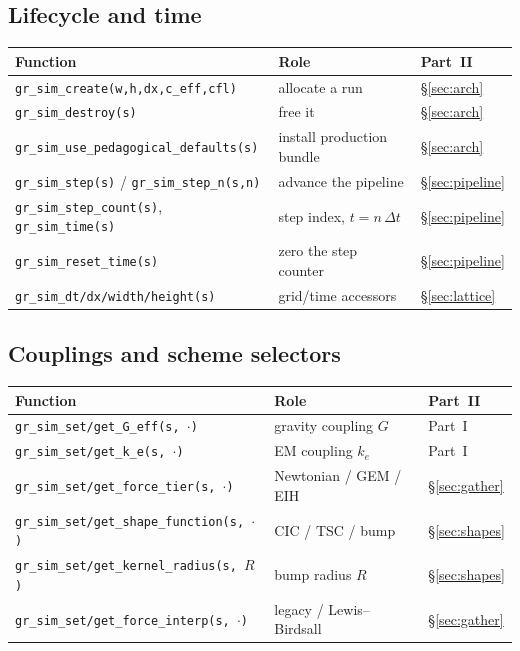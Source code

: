 \documentclass[11pt]{article}
\newcommand{\dt}{\Delta t}                 %
\newcommand{\keff}{k_e}
\begin{document}
\subsection{Lifecycle and time}
\nopagebreak
{\footnotesize
\begin{tabular}{@{}F{8.2cm}L{4.9cm}L{1.4cm}@{}}
\toprule
\textbf{Function} & \textbf{Role} & \textbf{Part~II} \\
\midrule
\texttt{gr\_sim\_create(w,h,dx,c\_eff,cfl)} & allocate a run & \S\ref{sec:arch} \\
\texttt{gr\_sim\_destroy(s)} & free it & \S\ref{sec:arch} \\
\texttt{gr\_sim\_use\_pedagogical\_defaults(s)} & install production bundle & \S\ref{sec:arch} \\
\texttt{gr\_sim\_step(s)} / \texttt{gr\_sim\_step\_n(s,n)} & advance the pipeline & \S\ref{sec:pipeline} \\
\texttt{gr\_sim\_step\_count(s)}, \texttt{gr\_sim\_time(s)} & step index, $t=n\,\dt$ & \S\ref{sec:pipeline} \\
\texttt{gr\_sim\_reset\_time(s)} & zero the step counter & \S\ref{sec:pipeline} \\
\texttt{gr\_sim\_dt/dx/width/height(s)} & grid/time accessors & \S\ref{sec:lattice} \\
\bottomrule
\end{tabular}}

\subsection{Couplings and scheme selectors}
\nopagebreak
{\footnotesize
\begin{tabular}{@{}F{8.2cm}L{4.9cm}L{1.4cm}@{}}
\toprule
\textbf{Function} & \textbf{Role} & \textbf{Part~II} \\
\midrule
\texttt{gr\_sim\_set/get\_G\_eff(s,\,$\cdot$)} & gravity coupling $G$ & Part~I \\
\texttt{gr\_sim\_set/get\_k\_e(s,\,$\cdot$)} & EM coupling $\keff$ & Part~I \\
\texttt{gr\_sim\_set/get\_force\_tier(s,\,$\cdot$)} & Newtonian / GEM / EIH & \S\ref{sec:gather} \\
\texttt{gr\_sim\_set/get\_shape\_function(s,\,$\cdot$)} & CIC / TSC / bump & \S\ref{sec:shapes} \\
\texttt{gr\_sim\_set/get\_kernel\_radius(s,\,$R$)} & bump radius $R$ & \S\ref{sec:shapes} \\
\texttt{gr\_sim\_set/get\_force\_interp(s,\,$\cdot$)} & legacy / Lewis--Birdsall & \S\ref{sec:gather} \\
\bottomrule
\end{tabular}}
\end{document}
